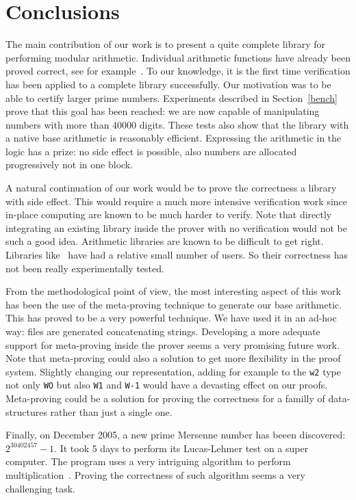 \section{Conclusions}

The main contribution of our work is to present a quite complete library for performing
modular arithmetic. Individual arithmetic functions have already been proved correct,
see for example~\cite{BerMagZim02}. To our knowledge, it is the first time verification
has been applied to a complete library  successfully.
Our motivation was to be able to certify 
larger prime numbers. Experiments described in Section~\ref{bench}  prove that
this goal has been reached: we are now capable of manipulating numbers with more than 40000 digits.
These tests also show that the library with a native base arithmetic is
reasonably efficient. Expressing the arithmetic in the logic has a prize: no side effect is possible, 
also numbers are allocated progressively not in one block.

A natural continuation of our work would be to prove the correctness a library with side effect.
This would require a much more intensive verification work since in-place computing
are known to be much harder to verify.
Note that directly integrating an existing library inside the prover with no verification
would not be such a good idea.
Arithmetic libraries are known to be difficult to get right. Libraries like~\cite{bignum}
have had a relative small number of users. So their correctness has not
been really experimentally tested.

From the methodological point of view, the most interesting aspect of this work
has been the use of the meta-proving technique to generate our base arithmetic. This has proved
to be a very powerful technique. We have used it in an ad-hoc way: files are generated concatenating
strings. Developing a more adequate support for meta-proving inside the prover seems a
very promising future work. Note that meta-proving could also a solution to get more flexibility
in the proof system. Slightly changing our representation, adding for example to  the {\tt w2} type not only {\tt WO}
but also {\tt W1} and {\tt W-1} would have a devasting effect on our proofs.
Meta-proving could be a solution for proving the correctness for a familly of data-structures rather than
just a single one.

Finally, on December 2005, a new prime Mersenne number has beeen discovered: $2 ^{30402457} - 1$.
It took 5 days to  perform its Lucas-Lehmer test on a super computer. The program
uses a very intriguing algorithm to perform multiplication~\cite{crandall}. Proving the correctness of
such algorithm seems a very challenging task. 